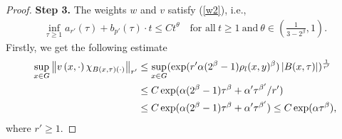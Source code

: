 \documentclass[preprint,11pt]{elsarticle}
\numberwithin{equation}{section}
\begin{document}
\begin{proof}
		\textbf{Step 3.}  The weights $w$ and $v$ satisfy (\ref{w2}), i.e.,
		\begin{align*}
			\inf_{\tau\ge 1} a_{r'}(\tau ) +b_{p'}(\tau ) \cdot t\le Ct^{\theta}\quad \text{for~all} ~t\ge 1~\text{and}~\theta\in (\frac{1}{3-2^{\beta}},1).
		\end{align*}
		Firstly, we get the following estimate
		\begin{align}\label{sub2.5}
			\sup_{x\in G}\left \| v\left ( x,\cdot \right )\chi _{B\left ( x,\tau  \right )\left ( \cdot  \right )  }  \right \|_{r'} 
			&\le\sup_{x\in G}( \exp(r'\alpha (2^{\beta }-1) \rho_{l }(x,y)^{\beta})\left| B(x,\tau)\right|) ^\frac{1}{r'}\notag\\
			&\le C\exp(\alpha (2^{\beta }-1)\tau^\beta+\alpha'\tau^{\beta'}/r')\notag\\
			&\le C\exp(\alpha (2^{\beta }-1)\tau^\beta+\alpha'\tau^{\beta'})\le C\exp(\alpha \tau^\beta),
		\end{align}
		where $r'\ge 1$. 
		

\end{proof}
\end{document}
